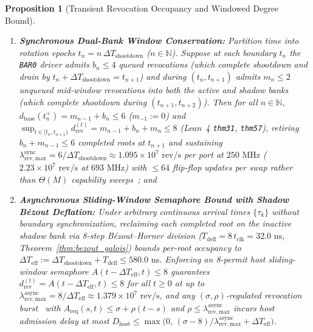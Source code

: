 \documentclass[11pt,letterpaper]{article}
\theoremstyle{spectralthm}
\newtheorem{proposition}[theorem]{Proposition}
\begin{document}
\begin{proposition}[Transient Revocation Occupancy and Windowed Degree Bound]
\begin{enumerate}
  \[
  \lim_{T\to\infty} \frac{1}{T}\int_0^T d_{\mathrm{rev}}^{(t)}\,dt = \lambda_{\mathrm{rev}}\,\overline{W} \le \lambda_{\mathrm{rev}}\,\Delta T_{\mathrm{shootdown}};
  \]
  \item[(iii)] \textbf{Synchronous Dual-Bank Window Conservation:} Partition time into rotation epochs $t_n = n\,\Delta T_{\mathrm{shootdown}}$ ($n \in \mathbb{N}$). Suppose at each boundary $t_n$ the \texttt{BAR0} driver admits $b_n \le 4$ queued revocations (which complete shootdown and drain by $t_n + \Delta T_{\mathrm{shootdown}} = t_{n+1}$) and during $(t_n, t_{n+1})$ admits $m_n \le 2$ unqueued mid-window revocations into both the active and shadow banks (which complete shootdown during $(t_{n+1}, t_{n+2})$). Then for all $n \in \mathbb{N}$, $d_{\mathrm{base}}(t_n^+) = m_{n-1} + b_n \le 6$ ($m_{-1} := 0$) and $\sup_{t \in [t_n, t_{n+1})} d_{\mathrm{rev}}^{(t)} = m_{n-1} + b_n + m_n \le 8$ (Lean~4 \texttt{thm31}, \texttt{thm57}), retiring $b_n + m_{n-1} \le 6$ completed roots at $t_{n+1}$ and sustaining $\lambda_{\mathrm{rev,max}}^{\mathrm{sync}} = 6 / \Delta T_{\mathrm{shootdown}} \approx 1.095 \times 10^7\text{~rev/s}$ per port at $250\text{~MHz}$ ($2.23 \times 10^7\text{~rev/s}$ at $693\text{~MHz}$) with $\le 64$ flip-flop updates per swap rather than $\Theta(M)$ capability sweeps~\cite{filardo2020cornucopia, filardo2024cornucopiareloaded}; and
  \item[(iv)] \textbf{Asynchronous Sliding-Window Semaphore Bound with Shadow B\'{e}zout Deflation:} Under arbitrary continuous arrival times $\{\tau_k\}$ without boundary synchronization, reclaiming each completed root on the inactive shadow bank via 8-step B\'{e}zout--Horner division ($T_{\mathrm{defl}} = 8\,t_{\mathrm{clk}} = 32.0\text{~ns}$, Theorem~\ref{thm:bezout_galois}) bounds per-root occupancy to $\Delta T_{\mathrm{eff}} := \Delta T_{\mathrm{shootdown}} + T_{\mathrm{defl}} \le 580.0\text{~ns}$. Enforcing an 8-permit host sliding-window semaphore $A(t - \Delta T_{\mathrm{eff}}, t) \le 8$ guarantees $d_{\mathrm{rev}}^{(t)} = A(t - \Delta T_{\mathrm{eff}}, t) \le 8$ for all $t \ge 0$ at up to $\lambda_{\mathrm{rev,max}}^{\mathrm{async}} = 8 / \Delta T_{\mathrm{eff}} \approx 1.379 \times 10^7\text{~rev/s}$, and any $(\sigma, \rho)$-regulated revocation burst~\cite{cruz1991calculus} with $A_{\mathrm{req}}(s,t) \le \sigma + \rho(t-s)$ and $\rho \le \lambda_{\mathrm{rev,max}}^{\mathrm{async}}$ incurs host admission delay at most $D_{\mathrm{host}} \le \max\!\bigl(0,\, (\sigma - 8)/\lambda_{\mathrm{rev,max}}^{\mathrm{async}} + \Delta T_{\mathrm{eff}}\bigr)$.
\end{enumerate}
\end{proposition}
\end{document}

